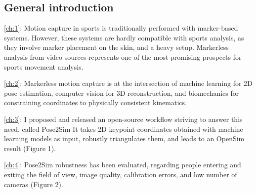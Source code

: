 {}

\vspace*{-1cm}
\begin{flushright}
\section*{\fontsize{20pt}{20pt}\selectfont\textnormal{General introduction}}
\end{flushright}
\vspace{2cm}

\chead[\fancyplain{}{}]
      {\fancyplain{}{}}
\lfoot[\fancyplain{}{}]%
      {\fancyplain{}{}}
\cfoot[\fancyplain{}{\thepage}]
      {\fancyplain{}{\thepage}}
\rfoot[\fancyplain{}{}]%
     {\fancyplain{}{\scriptsize}}
     


\autoref{ch:1}: Motion capture in sports is traditionally performed with marker-based systems. However, these systems are hardly compatible with sports analysis, as they involve marker placement on the skin, and a heavy setup. Markerless analysis from video sources represents one of the most promising prospects for sports movement analysis. 

\autoref{ch:2}: Markerless motion capture is at the intersection of machine learning for 2D pose estimation, computer vision for 3D reconstruction, and biomechanics for constraining coordinates to physically consistent kinematics. 

\autoref{ch:3}: I proposed and released an open-source workflow striving to answer this need, called Pose2Sim \cite{Pagnon2022b} It takes 2D keypoint coordinates obtained with machine learning models as input, robustly triangulates them, and leads to an OpenSim result (Figure 1). 

\autoref{ch:4}: Pose2Sim robustness has been evaluated, regarding people entering and exiting the field of view, image quality, calibration errors, and low number of cameras \cite{Pagnon2021} (Figure 2). 

